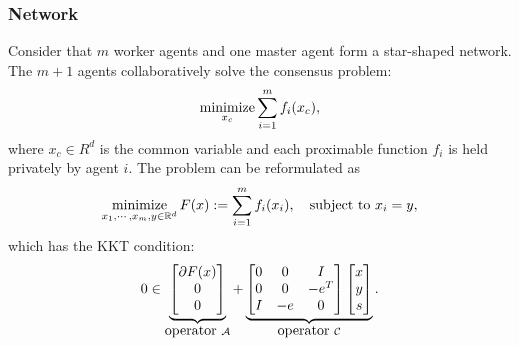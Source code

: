 \subsubsection{Network}\label{sec:network}
Consider that  $m$ worker agents and one master agent form a star-shaped network. The  $m+1$ agents collaboratively solve the consensus problem:  $$\operatorname*{minimize}_{x_c} \sum_{i=1}^m f_i(x_c),$$ where $x_c\in R^d$ is the common variable and each  proximable function $f_i$ is held privately by agent $i$. The problem can be reformulated as 
\begin{align}
\Min_{x_1,\cdots,x_m,y\in \RR^d} F(x) := \sum_{i=1}^mf_i(x_i),\quad \St~ x_i=y,   
\end{align}
{which has the  KKT condition}:
\begin{equation}\label{pro:decentral}
0\in\underbrace{
\begin{bmatrix}
\partial F(x)\\
0 \\
0
\end{bmatrix}}_{\mbox{operator}~\cA}+\underbrace{\begin{bmatrix}
0 & 0&I\\
0 & 0 & -e^T \\
I & -e & 0
\end{bmatrix}\begin{bmatrix}
x\\
y\\
s
\end{bmatrix}}_{\mbox{operator}~\cC}.
\end{equation}

